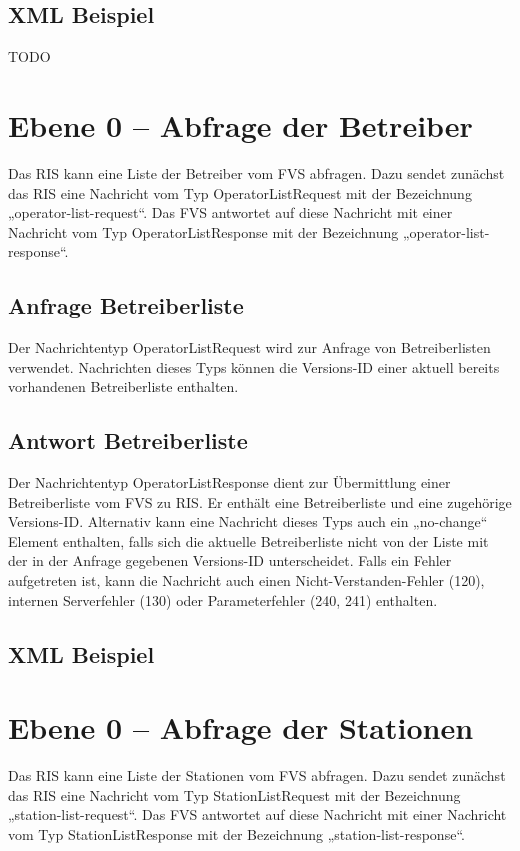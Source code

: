\subsection{XML Beispiel}
TODO

\section{Ebene 0 -- Abfrage der Betreiber}
Das RIS kann eine Liste der Betreiber vom FVS abfragen. Dazu sendet zunächst das RIS eine Nachricht vom Typ OperatorListRequest mit der Bezeichnung „operator-list-request“. Das FVS antwortet auf diese Nachricht mit einer Nachricht vom Typ OperatorListResponse mit der Bezeichnung „operator-list-response“.



\subsection{Anfrage Betreiberliste}
Der Nachrichtentyp OperatorListRequest wird zur Anfrage von Betreiberlisten verwendet. Nachrichten dieses Typs können die Versions-ID einer aktuell bereits vorhandenen Betreiberliste enthalten.



\subsection{Antwort Betreiberliste}
Der Nachrichtentyp OperatorListResponse dient zur Übermittlung einer Betreiberliste vom FVS zu RIS. Er enthält eine Betreiberliste und eine zugehörige Versions-ID. Alternativ kann eine Nachricht dieses Typs auch ein „no-change“ Element enthalten, falls sich die aktuelle Betreiberliste nicht von der Liste mit der in der Anfrage gegebenen Versions-ID  unterscheidet. Falls ein Fehler aufgetreten ist, kann die Nachricht auch einen Nicht-Verstanden-Fehler (120), internen Serverfehler (130) oder Parameterfehler (240, 241) enthalten.



\subsection{XML Beispiel}

\section{Ebene 0 -- Abfrage der Stationen}
Das RIS kann eine Liste der Stationen vom FVS abfragen. Dazu sendet zunächst das RIS eine Nachricht vom Typ StationListRequest mit der Bezeichnung „station-list-request“. Das FVS antwortet auf diese Nachricht mit einer Nachricht vom Typ StationListResponse mit der Bezeichnung „station-list-response“.

